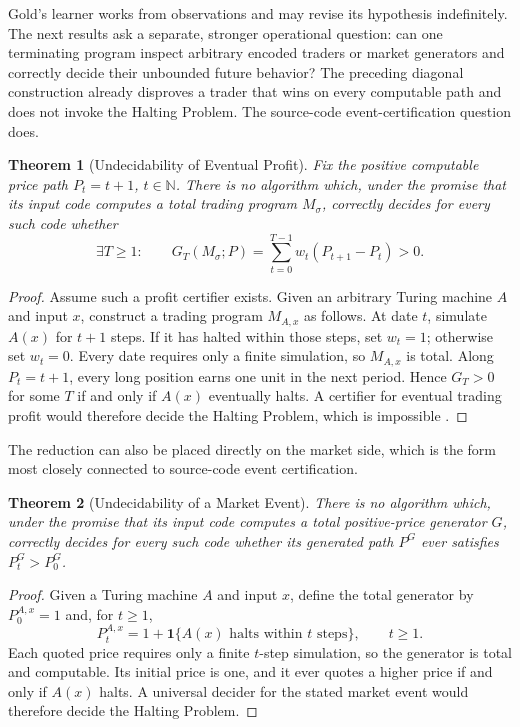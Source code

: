 \documentclass[aps,pra,reprint,superscriptaddress,amsmath,amssymb,floatfix]{revtex4-2}
\theoremstyle{plain}
\newtheorem{theorem}{Theorem}
\theoremstyle{definition}
\theoremstyle{remark}
\begin{document}
Gold's learner works from observations and may revise its hypothesis
indefinitely. The next results ask a separate, stronger operational question:
can one terminating program inspect arbitrary encoded traders or market
generators and correctly decide their unbounded future behavior? The preceding
diagonal construction already disproves a trader that wins on every computable
path and does not invoke the Halting Problem. The source-code
event-certification question does.

\begin{theorem}[Undecidability of Eventual Profit]
  \label{thm:profit-undecidable}
  Fix the positive computable price path \(P_t=t+1\), \(t\in\mathbb{N}\).
  There is no algorithm which, under the promise that its input code computes
  a total trading program \(M_\sigma\), correctly decides for every such code
  whether
  \[
    \exists T\geq1:\qquad
    G_T(M_\sigma;P)=
    \sum_{t=0}^{T-1}w_t(P_{t+1}-P_t)>0.
  \]
\end{theorem}

\begin{proof}
Assume such a profit certifier exists. Given an arbitrary Turing machine
\(A\) and input \(x\), construct a trading program \(M_{A,x}\) as follows.
At date \(t\), simulate \(A(x)\) for \(t+1\) steps. If it has halted within
those steps, set \(w_t=1\); otherwise set \(w_t=0\). Every date requires only
a finite simulation, so \(M_{A,x}\) is total. Along \(P_t=t+1\), every long
position earns one unit in the next period. Hence \(G_T>0\) for some \(T\) if
and only if \(A(x)\) eventually halts. A certifier for eventual trading profit
would therefore decide the Halting Problem, which is impossible
\cite{turing-36}.
\end{proof}

The reduction can also be placed directly on the market side, which is the
form most closely connected to source-code event certification.

\begin{theorem}[Undecidability of a Market Event]
  \label{thm:market-undecidable}
  There is no algorithm which, under the promise that its input code computes
  a total positive-price generator \(G\), correctly decides for every such
  code whether its generated path \(P^G\) ever satisfies \(P_t^G>P_0^G\).
\end{theorem}

\begin{proof}
Given a Turing machine \(A\) and input \(x\), define the total generator by
\(P_0^{A,x}=1\) and, for \(t\geq1\),
\begin{equation}
  P_t^{A,x}
  =1+\mathbf{1}\{A(x)\text{ halts within }t\text{ steps}\},
  \qquad t\geq1 .
  \label{eq:market-halting}
\end{equation}
Each quoted price requires only a finite \(t\)-step simulation, so the
generator is total and computable. Its initial price is one, and it ever quotes
a higher price if and only if \(A(x)\) halts. A universal decider for the stated
market event would therefore decide the Halting Problem.
\end{proof}
\end{document}
